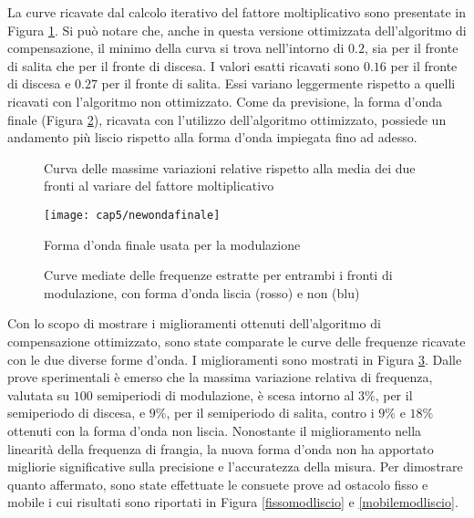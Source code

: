 La curve ricavate dal calcolo iterativo del fattore moltiplicativo sono presentate in Figura \ref{mulfactnew}. Si può notare che, anche in questa versione ottimizzata dell'algoritmo di compensazione, il minimo della curva si trova nell'intorno di $0.2$, sia per il fronte di salita che per il fronte di discesa. I valori esatti ricavati sono $0.16$ per il fronte di discesa e $0.27$ per il fronte di salita. Essi variano leggermente rispetto a quelli ricavati con l'algoritmo non ottimizzato. 
Come da previsione, la forma d'onda finale (Figura \ref{newondafinale}), ricavata con l'utilizzo dell'algoritmo ottimizzato, possiede un andamento più liscio rispetto alla forma d'onda impiegata fino ad adesso.

\begin{figure}[H]
	\centering
\end{figure}
\begin{figure}[H]
	\centering
	\caption{Curva delle massime variazioni relative rispetto alla media dei due fronti al variare del fattore moltiplicativo}\label{mulfactnew}
\end{figure}
    \begin{figure}[H]
    	\begin{center}
    		\texttt{[image: cap5/newondafinale]}
    		\caption{Forma d'onda finale usata per la modulazione}
    		\label{newondafinale}
    	\end{center}
    \end{figure}

\begin{figure}[H]
	\centering
\end{figure}
\begin{figure}[H]
	\centering
	\caption{Curve mediate delle frequenze estratte per entrambi i fronti di modulazione, con forma d'onda liscia (rosso) e non (blu)}\label{primadopocompnew}
\end{figure}
Con lo scopo di mostrare i miglioramenti ottenuti dell'algoritmo di compensazione ottimizzato, sono state comparate le curve delle frequenze ricavate con le due diverse forme d'onda. I miglioramenti sono mostrati in Figura \ref{primadopocompnew}. Dalle prove sperimentali è emerso che la massima variazione relativa di frequenza, valutata su $100$ semiperiodi di modulazione, è scesa intorno al $3\%$, per il semiperiodo di discesa, e $9\%$, per il semiperiodo di salita, contro i $9\%$ e $18\%$ ottenuti con la forma d'onda non liscia.
Nonostante il miglioramento nella linearità della frequenza di frangia, la nuova forma d'onda non ha apportato migliorie significative sulla precisione e l'accuratezza della misura. Per dimostrare quanto affermato, sono state effettuate le consuete prove ad ostacolo fisso e mobile i cui risultati sono riportati in Figura \ref{fissomodliscio} e \ref{mobilemodliscio}.

